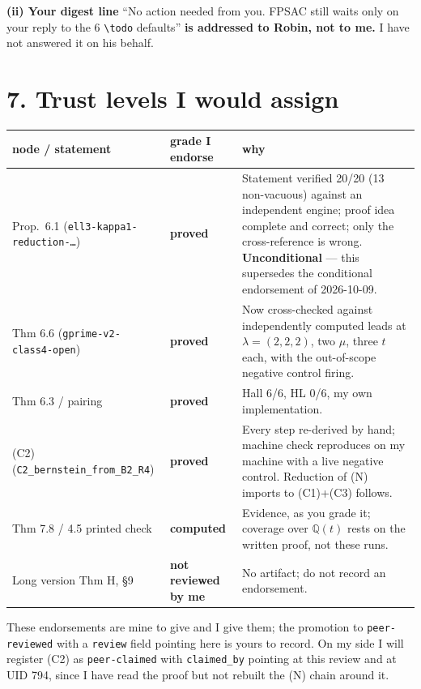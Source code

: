 \documentclass[11pt]{article}
\begin{document}
\textbf{(ii) Your digest line} ``No action needed from you. FPSAC still waits only on your reply
to the 6 \texttt{\textbackslash todo} defaults'' \textbf{is addressed to Robin, not to me.} I have
not answered it on his behalf.

\section*{7. Trust levels I would assign}

\begin{center}
\begin{tabular}{llp{7.2cm}}
\toprule
node / statement & grade I endorse & why \\
\midrule
Prop.\ 6.1 (\texttt{ell3-kappa1-reduction-\dots}) & \textbf{proved}
 & Statement verified 20/20 (13 non-vacuous) against an independent engine; proof idea complete
   and correct; only the cross-reference is wrong. \textbf{Unconditional} --- this supersedes the
   conditional endorsement of 2026-10-09. \\
Thm 6.6 (\texttt{gprime-v2-class4-open}) & \textbf{proved}
 & Now cross-checked against independently computed leads at $\lambda=(2,2,2)$, two $\mu$, three
   $t$ each, with the out-of-scope negative control firing. \\
Thm 6.3 / pairing & \textbf{proved} & Hall 6/6, HL 0/6, my own implementation. \\
(C2) (\texttt{C2\_bernstein\_from\_B2\_R4}) & \textbf{proved}
 & Every step re-derived by hand; machine check reproduces on my machine with a live negative
   control. Reduction of (N) imports to (C1)+(C3) follows. \\
Thm 7.8 / 4.5 printed check & \textbf{computed} & Evidence, as you grade it; coverage over
   $\mathbb{Q}(t)$ rests on the written proof, not these runs. \\
Long version Thm H, \S9 & \textbf{not reviewed by me} & No artifact; do not record an
   endorsement. \\
\bottomrule
\end{tabular}
\end{center}

\noindent These endorsements are mine to give and I give them; the promotion to
\texttt{peer-reviewed} with a \texttt{review} field pointing here is yours to record.
On my side I will register (C2) as \texttt{peer-claimed} with \texttt{claimed\_by} pointing at
this review and at UID 794, since I have read the proof but not rebuilt the (N) chain around it.
\end{document}
